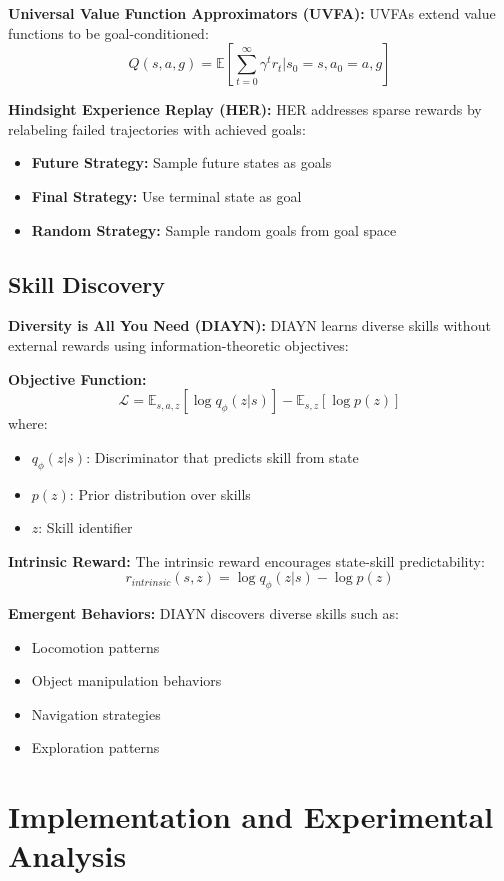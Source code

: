 \documentclass[12pt]{article}
\begin{document}
{{\textbf{Universal Value Function Approximators (UVFA):}
UVFAs extend value functions to be goal-conditioned:
\[
Q(s,a,g) = \mathbb{E}[\sum_{t=0}^{\infty} \gamma^t r_t | s_0 = s, a_0 = a, g]
\]

\textbf{Hindsight Experience Replay (HER):}
HER addresses sparse rewards by relabeling failed trajectories with achieved goals:
\begin{itemize}
    \item \textbf{Future Strategy:} Sample future states as goals
    \item \textbf{Final Strategy:} Use terminal state as goal
    \item \textbf{Random Strategy:} Sample random goals from goal space
\end{itemize}

\subsection{Skill Discovery}

\textbf{Diversity is All You Need (DIAYN):}
DIAYN learns diverse skills without external rewards using information-theoretic objectives:

\textbf{Objective Function:}
\[
\mathcal{L} = \mathbb{E}_{s,a,z}[\log q_\phi(z|s)] - \mathbb{E}_{s,z}[\log p(z)]
\]
where:
\begin{itemize}
    \item $q_\phi(z|s)$: Discriminator that predicts skill from state
    \item $p(z)$: Prior distribution over skills
    \item $z$: Skill identifier
\end{itemize}

\textbf{Intrinsic Reward:}
The intrinsic reward encourages state-skill predictability:
\[
r_{intrinsic}(s,z) = \log q_\phi(z|s) - \log p(z)
\]

\textbf{Emergent Behaviors:}
DIAYN discovers diverse skills such as:
\begin{itemize}
    \item Locomotion patterns
    \item Object manipulation behaviors
    \item Navigation strategies
    \item Exploration patterns
\end{itemize}

\section{Implementation and Experimental Analysis}

}}
\end{document}
